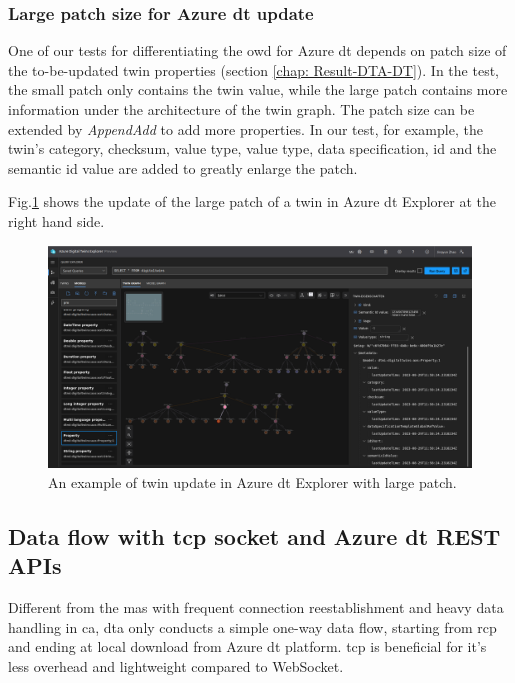 \subsubsection{Large patch size for Azure \gls{dt} update}
One of our tests for differentiating the \gls{owd} for Azure 
\gls{dt} depends on patch size of the to-be-updated 
twin properties (section \ref{chap: Result-DTA-DT}). In the test, 
the small patch only contains the twin value, while the large patch 
contains more information under the architecture of the twin graph. 
The patch size can be extended by \textit{AppendAdd} to add more properties. 
In our test, for example, the twin's category, checksum, value type, 
value type, data specification, id and the semantic id value are added 
to greatly enlarge the patch.   

Fig.\ref{fig: largepatchDT} shows the update of the large patch of a 
twin in Azure \gls{dt} Explorer at the right hand side. 


\begin{figure}[htb]
    \centering
    \includegraphics[width=\textwidth]{figures/methodology/Update_twin_largerPatch.png}
    \caption{An example of twin update in Azure \gls{dt} 
    Explorer with large patch.\label{fig: largepatchDT}}
\end{figure}

\subsection{Data flow with \gls{tcp} socket and Azure \gls{dt} REST APIs}\label{chap: RCPTCP-DTAPI}
Different from the \gls{mas} with frequent connection reestablishment and heavy data handling in \gls{ca}, 
\gls{dta} only conducts a simple one-way data flow, starting from \gls{rcp} and 
ending at local download from Azure \gls{dt} platform. \gls{tcp} is beneficial for 
it's less overhead and lightweight compared to WebSocket. 



